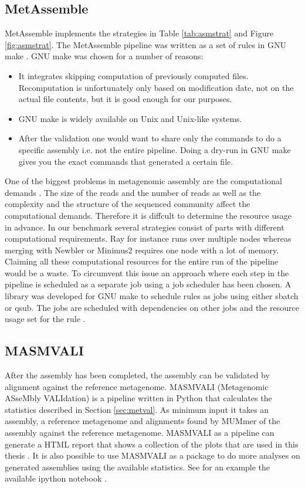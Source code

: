 \documentclass[a4paper,12pt]{report}
\begin{document}
\subsection{MetAssemble}
MetAssemble implements the strategies in Table \ref{tab:asmstrat} and Figure
\ref{fig:asmstrat}. The MetAssemble pipeline was written as a set of rules in
GNU make \cite{GNU make}. GNU make was chosen for a number of reasons:
\begin{itemize}
\item It integrates skipping computation of previously computed files.
    Recomputation is unfortunately only based on modification date, not on the
    actual file contents, but it is good enough for our purposes.
\item GNU make is widely available on Unix and Unix-like systems.
\item After the validation one would want to share only the commands to do a
    specific assembly i.e. not the entire pipeline. Doing a dry-run in GNU make
    gives you the exact commands that generated a certain file.
\end{itemize}
One of the biggest problems in metagenomic assembly are the
computational demands \cite{A practical comparison dada}. The size of the reads
and the number of reads as well as the complexity and the structure of the
sequenced community affect the computational demands. Therefore it is diffcult
to determine the resource usage in advance. In our benchmark several strategies
consist of parts with different computational requirements. Ray for instance
runs over multiple nodes whereas merging with Newbler or Minimus2
requires one node with a lot of memory. Claiming all these computational
resources for the entire run of the pipeline would be a waste. To circumvent
this issue an approach where each step in the pipeline is scheduled as a
separate job using a job scheduler has been chosen. A library was developed for
GNU make to schedule rules as jobs using either sbatch or qsub. The jobs are
scheduled with dependencies on other jobs and the resource usage set for the
rule \cite{link to github}. 

\subsection{MASMVALI}
After the assembly has been completed, the assembly can be validated by
alignment against the reference metagenome. MASMVALI (Metagenomic ASseMbly
VALIdation) is a pipeline written in Python\cite{Python} that calculates the
statistics described in Section \ref{sec:metval}. As minimum input it takes an
assembly, a reference metagenome and alignments found by MUMmer of the
assembly against the reference metagenome. MASMVALI as a pipeline can generate
a HTML report that shows a collection of the plots that are used in this thesis
\cite{github link}. It is also possible to use MASMVALI as a package to do more
analyses on generated assemblies using the available statistics. See for an
example the available ipython notebook \cite{notebook example} \cite{ipython}
\cite{notebook}.
\end{document}
